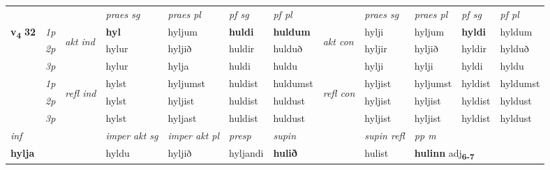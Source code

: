 \begin{longtable}[l]{X>{\footnotesize\itshape}llXXXXlXXXX}
 & &   & \textit{praes sg}  & \textit{praes pl}    & \textit{ pf sg} & \textit{pf pl} & & \textit{praes sg}  & \textit{praes pl}    & \textit{pf sg} & \textit{pf pl }  \\ \cmidrule{4-7} \cmidrule{9-12}
 \multirow{2}{*}{{{\textbf{v{\textsubscript{4}}} \Large{\textbf{32}}}}}  & 1p & \multirow{3}{*}{\begin{turn}{90}\textit{akt ind}\end{turn}} & \textbf{hyl} & hyljum & \textbf{huldi} & \textbf{huldum} & \multirow{3}{*}{\begin{turn}{90}\textit{akt con}\end{turn}} &hylji & hyljum & \textbf{hyldi} & hyldum\\*
 & 2p &  &  hylur  & hyljið & huldir & hulduð & & hyljir & hyljið & hyldir & hylduð \\*
 & 3p &  & hylur & hylja & huldi & huldu & & hylji & hylji& hyldi & hyldu \\*
\cmidrule{4-7} \cmidrule{9-12}
 & 1p & \multirow{3}{*}{\begin{turn}{90}\textit{refl ind}\end{turn}}  & hylst & hyljumst & huldist & huldumst & \multirow{3}{*}{\begin{turn}{90}\textit{refl con}\end{turn}}  &hyljist & hyljumst & hyldist & hyldumst \\*
 & 2p &  & hylst & hyljist & huldist & huldust & &hyljist & hyljist & hyldist & hyldust \\*
 & 3p  & & hylst & hyljast & huldist & huldust & & hyljist & hyljist& hyldist & hyldust \\*
\cmidrule{4-7} \cmidrule{9-12}

   {\textit{inf}} & &  & \textit{imper akt sg} & \textit{imper akt pl}   & \textit{presp} & \textit{supin} && \textit{supin refl} & \textit{pp m} \\*
  {\textbf{hylja}} & && hyldu  & hyljið   & hyljandi &  \textbf{hulið} && hulist & \multicolumn{2}{l}{\textbf{hulinn} adj\textbf{\textsubscript{6-7}}} \\*

\midrule


\end{longtable}
